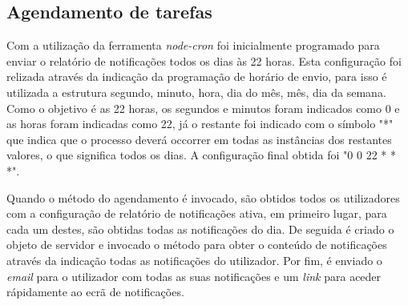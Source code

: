 \subsection{Agendamento de tarefas}

Com a utilização da ferramenta \textit{node-cron} foi inicialmente programado para enviar o relatório de notificações todos os dias às 22 horas. Esta configuração foi relizada através da indicação da programação de horário de envio, para isso é utilizada a estrutura segundo, minuto, hora, dia do mês, mês, dia da semana. Como o objetivo é as 22 horas, os segundos e minutos foram indicados como 0 e as horas foram indicadas como 22, já o restante foi indicado com o símbolo "*" que indica que o processo deverá occorrer em todas as instâncias dos restantes valores, o que significa todos os dias. A configuração final obtida foi "0 0 22 * * *".

Quando o método do agendamento é invocado, são obtidos todos os utilizadores com a configuração de relatório de notificações ativa, em primeiro lugar, para cada um destes, são obtidas todas as notificações do dia. De seguida é criado o objeto de servidor e invocado o método para obter o conteúdo de notificações através da indicação todas as notificações do utilizador. Por fim, é enviado o \textit{email} para o utilizador com todas as suas notificações e um \textit{link} para aceder rápidamente ao ecrã de notificações.